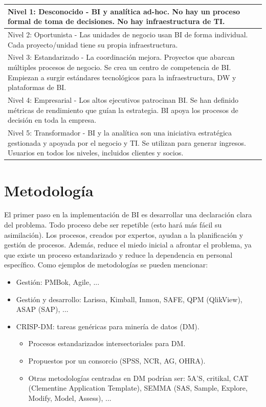 \begin{table}[h]
\centering
\begin{tabular}{p{15cm}}
    \hline
    \rowcolor{gray!10} Nivel 1: Desconocido - BI y analítica ad-hoc. No hay un proceso formal de toma de decisiones. No hay infraestructura de TI. \\ \hline
    
    Nivel 2: Oportunista - Las unidades de negocio usan BI de forma individual. Cada proyecto/unidad tiene su propia infraestructura. \\ \hline
    
    \rowcolor{gray!10} Nivel 3: Estandarizado - La coordinación mejora. Proyectos que abarcan múltiples procesos de negocio. Se crea un centro de competencia de BI. Empiezan a surgir estándares tecnológicos para la infraestructura, DW y plataformas de BI. \\ \hline
    
    Nivel 4: Empresarial - Los altos ejecutivos patrocinan BI. Se han definido métricas de rendimiento que guían la estrategia. BI apoya los procesos de decisión en toda la empresa. \\ \hline
    
    \rowcolor{gray!10} Nivel 5: Transformador - BI y la analítica son una iniciativa estratégica gestionada y apoyada por el negocio y TI. Se utilizan para generar ingresos. Usuarios en todos los niveles, incluidos clientes y socios. \\ \hline
\end{tabular}
\end{table}


\section{Metodología}

El primer paso en la implementación de BI es desarrollar una declaración clara del problema. Todo proceso debe ser repetible (esto hará más fácil su asimilación). Los procesos, creados por expertos, ayudan a la planificación y gestión de procesos. Además, reduce el miedo inicial a afrontar el problema, ya que existe un proceso estandarizado y reduce la dependencia en personal específico. Como ejemplos de metodologías se pueden mencionar:
\begin{itemize}
\item Gestión: PMBok, Agile, ... 
\item Gestión y desarrollo: Larissa, Kimball, Inmon, SAFE, QPM (QlikView), ASAP (SAP), ...
\item CRISP-DM: tareas genéricas para minería de datos (DM).
\begin{itemize}
    \item Procesos estandarizados intersectoriales para DM.
    \item Propuestos por un consorcio (SPSS, NCR, AG, OHRA).
    \item Otras metodologías centradas en DM podrían ser: 5A'S, critikal, CAT (Clementine Application Template), SEMMA (SAS, Sample, Explore, Modify, Model, Assess), ... 
\end{itemize}
\end{itemize}

